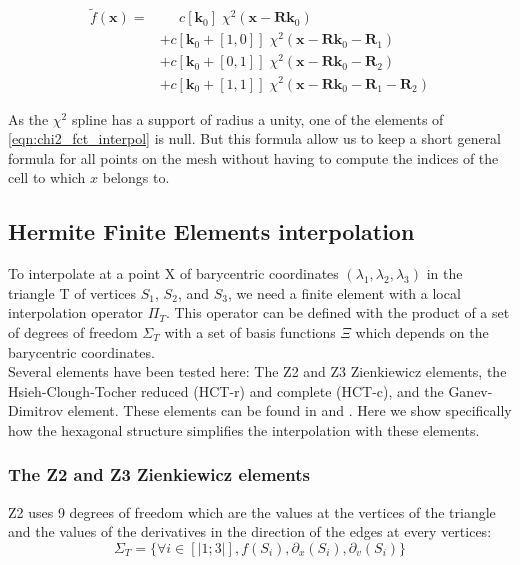 \documentclass[proc]{edpsmath}
\begin{document}
\begin{align}
\label{eqn:chi2_fct_interpol}
\tilde{f}(\mathbf{x}) =& \;\;\;\;\; c[\mathbf{k}_0] \; \chi^2(\mathbf{x} - \mathbf{R}\mathbf{k}_0) \nonumber\\
	&+ c[\mathbf{k}_0 +[1,0]]\; \chi^2(\mathbf{x} - \mathbf{R}\mathbf{k}_0 - \mathbf{R}_1) \nonumber\\
	&+ c[\mathbf{k}_0 +[0,1]]\; \chi^2(\mathbf{x} - \mathbf{R}\mathbf{k}_0 - \mathbf{R}_2) \nonumber\\
	&+ c[\mathbf{k}_0 +[1,1]]\; \chi^2(\mathbf{x} - \mathbf{R}\mathbf{k}_0 - \mathbf{R}_1 - \mathbf{R}_2)
\end{align}

\rmrk  As the $\chi^2$ spline has a support of radius a unity, one of the elements of \eqref{eqn:chi2_fct_interpol} is null. But this formula allow us to keep a short general formula for all points on the mesh without having to compute the indices of the cell to which $x$ belongs to.


\subsection{Hermite Finite Elements interpolation}

To interpolate at a point X of barycentric coordinates $(\lambda_1,\lambda_2,\lambda_3)$ in the triangle T of vertices $S_1$, $S_2$, and $S_3$, we need a finite element with a local interpolation operator $\Pi_T $. This operator can be defined with the product of a set of degrees of freedom $\Sigma_T$ with a set of basis functions $\Xi$ which depends on the barycentric coordinates.\\

Several elements have been tested here:
The Z2 and Z3 Zienkiewicz elements, the Hsieh-Clough-Tocher reduced (HCT-r) and complete (HCT-c), and the Ganev-Dimitrov element. These elements can be found in \cite{z} and \cite{b1} . Here we show specifically how the hexagonal structure simplifies the interpolation with these elements.\\

\subsubsection{The Z2 and Z3 Zienkiewicz elements}
Z2 uses 9 degrees of freedom which are the values at the vertices of the triangle and the values of the derivatives in the direction of the edges at every vertices:
\begin{equation*}
 \Sigma_T = \lbrace \forall i \in [|1;3|], f(S_i),\partial_x(S_i),\partial_v(S_i) \rbrace 
\end{equation*}
\end{document}
